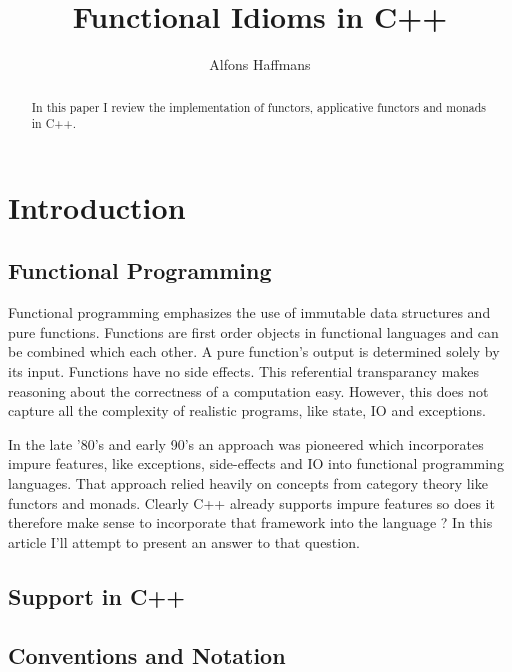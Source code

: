 \documentclass[12pt,fleqn]{article}
\begin{document}
\title{Functional Idioms in C++}
\author {Alfons Haffmans}
\maketitle
\begin{abstract}
In this paper I review the implementation of functors, applicative functors and monads in C++.
 
\end{abstract}

\tableofcontents

\section{Introduction}

\subsection{Functional Programming}

Functional programming emphasizes the use of immutable data structures and pure functions.
Functions are first order objects in functional languages and can be combined which each other.
A pure function's output is determined solely by its input.
Functions have no side effects.
This referential transparancy makes reasoning about the correctness of a computation easy.
However, this does not capture all the complexity of realistic programs, like state, IO and exceptions. 

In the late '80's and early 90's an approach was pioneered which incorporates impure features, like exceptions, side-effects and IO
into functional programming languages. 
That approach relied heavily on concepts from category theory like functors and monads.
Clearly C++ already supports impure features so does it therefore make sense to incorporate that framework into the language ?
In this article I'll attempt to present an answer to that question.


\subsection{Support in C++}

\subsection{Conventions and Notation}
\end{document}
